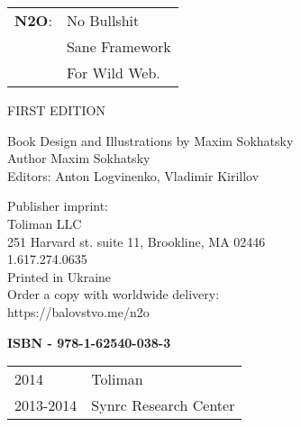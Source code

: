 \begingroup
{}
\parindent 0pt
\parskip
\baselineskip

\begin{tabular}{ll}
{\bf N2O}: & No Bullshit \\
    & Sane Framework \\
    & For Wild Web. \\
\end{tabular}

FIRST EDITION

Book Design and Illustrations by Maxim Sokhatsky \\
Author Maxim Sokhatsky \\
Editors: Anton Logvinenko, Vladimir Kirillov

Publisher imprint: \\
Toliman LLC \\
251 Harvard st. suite 11, Brookline, MA 02446 \\
1.617.274.0635 \\

Printed in Ukraine \\

Order a copy with worldwide delivery: \\
https://balovstvo.me/n2o

{\bf  ISBN - 978-1-62540-038-3\hspace{2em}}

\begin{tabular}{ll}
\textcopyright{} 2014 & Toliman \\
\textcopyright{} 2013-2014 & Synrc Research Center
\end{tabular}

\endgroup

   \thispagestyle{empty}
 